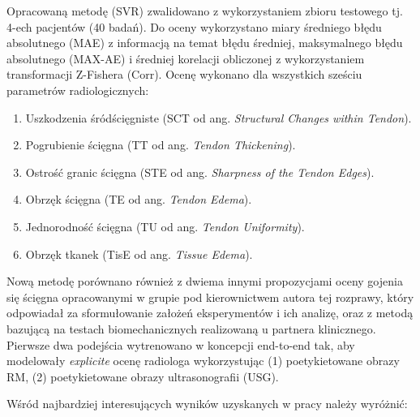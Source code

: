 Opracowaną metodę (SVR) zwalidowano z wykorzystaniem zbioru testowego tj. 4-ech pacjentów (40 badań). Do oceny wykorzystano miary średniego błędu absolutnego (MAE) z informacją na temat błędu średniej, maksymalnego błędu absolutnego (MAX-AE) i średniej korelacji obliczonej z wykorzystaniem transformacji Z-Fishera (Corr). Ocenę wykonano dla wszystkich sześciu parametrów radiologicznych:

\begin{enumerate}
	\item Uszkodzenia śródścięgniste (SCT od ang. \textit{Structural Changes within Tendon}).
	\item Pogrubienie ścięgna (TT od ang. \textit{Tendon Thickening}).
	\item Ostrość granic ścięgna (STE od ang. \textit{Sharpness of the Tendon Edges}).
	\item Obrzęk ścięgna (TE od ang. \textit{Tendon Edema}).
	\item Jednorodność ścięgna (TU od ang. \textit{Tendon Uniformity}).
	\item Obrzęk tkanek (TisE od ang. \textit{Tissue Edema}).
\end{enumerate}

Nową metodę porównano również z dwiema innymi propozycjami oceny gojenia się ścięgna opracowanymi w grupie pod kierownictwem autora tej rozprawy, który odpowiadał za sformułowanie założeń eksperymentów i ich analizę, oraz z metodą bazującą na testach biomechanicznych realizowaną u partnera klinicznego. Pierwsze dwa podejścia wytrenowano w koncepcji end-to-end tak, aby modelowały \textit{explicite} ocenę radiologa wykorzystując (1) poetykietowane obrazy RM, (2) poetykietowane obrazy ultrasonografii (USG).

Wśród najbardziej interesujących wyników uzyskanych w pracy należy wyróżnić:


